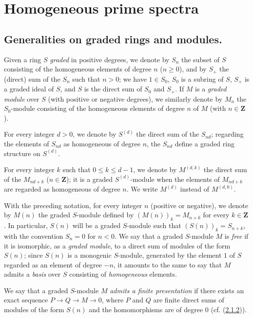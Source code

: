 \section{Homogeneous prime spectra}
\label{section:II.2}

\subsection{Generalities on graded rings and modules.}
\label{subsection:II.2.1}

\begin{notation}[2.1.1]
\label{II.2.1.1}
Given a ring $S$ \emph{graded} in positive degrees, we denote
by $S_n$ the subset of $S$ consisting of the homogeneous elements of degree
$n$ ($n\geq0$), and by $S_+$ the (direct) sum of the $S_n$ such that $n>0$;
we have $1\in S_0$, $S_0$ is a subring of $S$, $S_+$ is a graded ideal of
$S$, and $S$ is the direct sum of $S_0$ and $S_+$. If $M$ is a \emph{graded
module} over $S$ (with positive or negative degrees), we similarly denote by
$M_n$ the $S_0$-module consisting of the homogeneous elements of degree $n$
of $M$ (with $n\in\mathbf{Z}$).

For every integer $d>0$, we denote by $S^{(d)}$ the direct sum of the
$S_{nd}$; regarding the elements of $S_{nd}$ as homogeneous of degree
$n$, the $S_{nd}$ define a graded ring structure on $S^{(d)}$.

For every integer $k$ such that $0\leq k\leq d-1$, we denote by
$M^{(d,k)}$ the direct sum
of the $M_{nd+k}$ ($n\in\mathbf{Z}$); it is a graded $S^{(d)}$-module when
the elements of $M_{nd+k}$ are regarded as homogeneous of degree $n$. We
write $M^{(d)}$ instead of $M^{(d,0)}$.

With the preceding notation, for every integer $n$ (positive or negative),
we denote by $M(n)$ the graded $S$-module defined by
$(M(n))_k=M_{n+k}$ for every $k\in\mathbf{Z}$. In particular, $S(n)$ will be
a graded $S$-module such that $(S(n))_k=S_{n+k}$, with the convention
$S_n=0$ for $n<0$. We say that a graded $S$-module $M$ is \emph{free}
if it is isomorphic, as a \emph{graded module}, to a direct sum of
modules of the form $S(n)$; since $S(n)$ is a monogenic $S$-module,
generated by the element $1$ of $S$ regarded as an element of degree $-n$,
it amounts to the same to say that $M$ admits a \emph{basis} over $S$
consisting of \emph{homogeneous} elements.

We say that a graded $S$-module $M$ \emph{admits a finite presentation} if
there exists an exact sequence $P\to Q\to M\to0$, where $P$ and $Q$ are
finite direct sums of modules of the form $S(n)$ and the homomorphisms are
of degree $0$ (cf. (\hyperref[II.2.1.2]{2.1.2})).
\end{notation}

